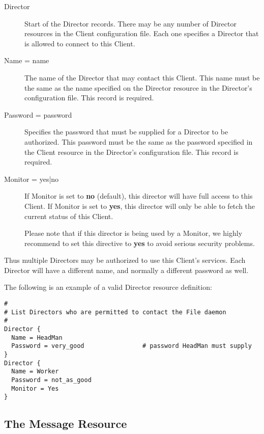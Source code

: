 \begin{description}

\item [Director]
   Start of the Director records. There may be any  number of Director resources
in the Client configuration file. Each  one specifies a Director that is
allowed to connect to this  Client. 

\item [Name = \lt{}name\gt{}]
   The name of the Director  that may contact this Client. This name must be the 
same as the name specified on the Director resource  in the Director's
configuration file. This record is required. 

\item [Password = \lt{}password\gt{}]
   Specifies the password that must be  supplied for a Director to be authorized.
This password  must be the same as the password specified in the  Client
resource in the Director's configuration file.  This record is required. 

\item [Monitor = \lt{}yes|no\gt{}]
   If Monitor is set to {\bf no} (default),  this director will have full access
to this Client. If Monitor is set to  {\bf yes}, this director will only be
able to fetch the current status  of this Client.

Please note that if this director is being used by a Monitor, we highly 
recommend to set this directive to {\bf yes} to avoid serious security 
problems. 
\end{description}

Thus multiple Directors may be authorized to use this Client's services. Each
Director will have a different name, and normally a different password as
well. 

The following is an example of a valid Director resource definition: 

\footnotesize
\begin{verbatim}
#
# List Directors who are permitted to contact the File daemon
#
Director {
  Name = HeadMan
  Password = very_good                # password HeadMan must supply
}
Director {
  Name = Worker
  Password = not_as_good
  Monitor = Yes
}
\end{verbatim}
\normalsize

\subsection*{The Message Resource}
\label{MessagesResource}

